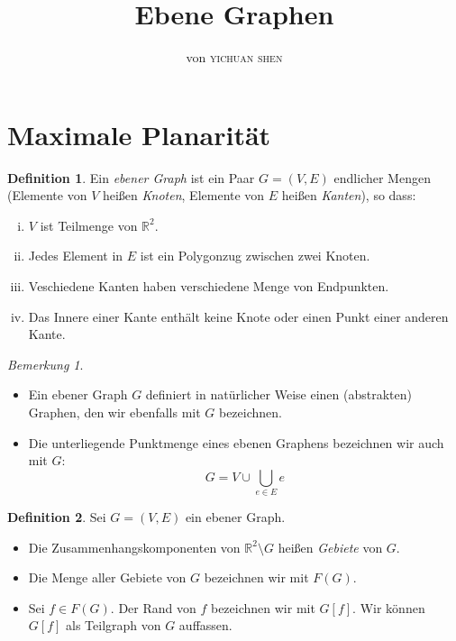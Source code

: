 \documentclass[10pt,b5paper]{article}
\author{von \textsc{yichuan shen}}
\title{Ebene Graphen}
\begin{document}
\theoremstyle{plain}
\theoremstyle{definition}
\newtheorem{theorem}{Theorem}
\newtheorem{lemma}[theorem]{Lemma}
\newtheorem{proposition}[theorem]{Satz}
\newtheorem{corollary}[theorem]{Korollar}
\theoremstyle{definition}
\newtheorem*{definition}{Definition}
\newtheorem*{example}{Beispiel}
\theoremstyle{remark}
\newtheorem*{remark}{Bemerkung}

\maketitle

\section{Maximale Planarität}

\begin{definition}
Ein \textit{ebener Graph} ist ein Paar $G= (V, E)$ endlicher Mengen (Elemente von $V$ heißen \textit{Knoten}, Elemente von $E$ heißen \textit{Kanten}), so dass:
\begin{enumerate}[(i)]
\item $V$ ist Teilmenge von $\mathbb{R}^2$.
\item Jedes Element in $E$ ist ein Polygonzug zwischen zwei Knoten.
\item  Veschiedene Kanten haben verschiedene Menge von Endpunkten.
\item Das Innere einer Kante enthält keine Knote oder einen Punkt einer anderen Kante.
\end{enumerate}
\end{definition}

\begin{remark}
\begin{itemize}
\item  Ein ebener Graph $G$ definiert in natürlicher Weise einen (abstrakten) Graphen, den wir ebenfalls mit $G$ bezeichnen.
\item Die unterliegende Punktmenge eines ebenen Graphens bezeichnen wir auch mit $G$:
\[ G = V \cup\bigcup_{e\in E}e \]
\end{itemize}
\end{remark}

\begin{definition}
Sei $G = (V, E)$ ein ebener Graph. 
\begin{itemize}
\item Die Zusammenhangskomponenten von $\mathbb{R}^2\setminus G$ heißen \textit{Gebiete} von $G$. 
\item Die Menge aller Gebiete von $G$ bezeichnen wir mit $F(G)$.
\item Sei $f\in F(G)$. Der Rand von $f$ bezeichnen wir mit $G[f]$. Wir können $G[f]$ als Teilgraph von $G$ auffassen.
\end{itemize}
\end{definition}
\end{document}
